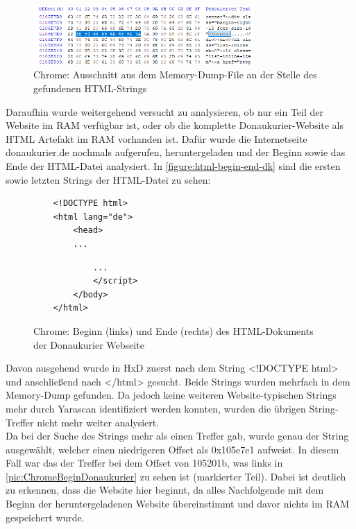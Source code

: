 \begin{figure}[h!]
	\centering
	\includegraphics[width=0.75\textwidth]{bilder/HxDChromeStringThemen_cropped.png}
	\caption{Chrome: Ausschnitt aus dem Memory-Dump-File an der Stelle des gefundenen HTML-Strings}
	\label{pic:ChromeStringThemen}
\end{figure} 

Daraufhin wurde weitergehend versucht zu analysieren, ob nur ein Teil der Website im RAM verfügbar ist, oder ob die komplette Donaukurier-Website als HTML Artefakt im RAM vorhanden ist. Dafür wurde die Internetseite donaukurier.de nochmals aufgerufen, heruntergeladen und der Beginn sowie das Ende der HTML-Datei analysiert. In \autoref{figure:html-begin-end-dk} sind die ersten sowie letzten Strings der HTML-Datei zu sehen:\\


\begin{figure}[!h]
 \begin{minipage}{0.5\textwidth}
  \centering
	\begin{verbatim}
	<!DOCTYPE html>
	<html lang="de">
		<head>
		...
	\end{verbatim}
 \end{minipage}
 \begin{minipage}{0.5\textwidth}
  \centering
	\begin{verbatim}
			...
	    	</script>
		</body>
	</html>
	\end{verbatim}
 \end{minipage}
\caption{Chrome: Beginn (links) und Ende (rechts) des HTML-Dokuments der Donaukurier Webseite}
  \label{figure:html-begin-end-dk}
\end{figure}


Davon ausgehend wurde in HxD zuerst nach dem String \glqq{}<!DOCTYPE html>\grqq{} und anschließend nach \glqq{}</html>\grqq{} gesucht. Beide Strings wurden mehrfach in dem Memory-Dump gefunden. Da jedoch keine weiteren Website-typischen Strings mehr durch Yarascan identifiziert werden konnten, wurden die übrigen String-Treffer nicht mehr weiter analysiert.\\
Da bei der Suche des Strings mehr als einen Treffer gab, wurde genau der String ausgewählt, welcher einen niedrigeren Offset als 0x105e7e1 aufweist. In diesem Fall war das der Treffer bei dem Offset von 105201b, was links in \autoref{pic:ChromeBeginDonaukurier} zu sehen ist (markierter Teil). Dabei ist deutlich zu erkennen, dass die Website hier beginnt, da alles Nachfolgende mit dem Beginn der heruntergeladenen Website übereinstimmt und davor nichts im RAM gespeichert wurde.

